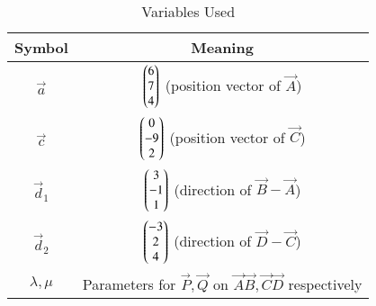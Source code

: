 \begin{table}[h!]
\centering
\begin{tabular}{|c|c|}
\hline
Symbol & Meaning \\ \hline
$\vec{a}$ & $\begin{pmatrix}6\\7\\4\end{pmatrix}$ (position vector of $\vec{A}$) \\ \hline
$\vec{c}$ & $\begin{pmatrix}0\\-9\\2\end{pmatrix}$ (position vector of $\vec{C}$) \\ \hline
$\vec{d}_1$ & $\begin{pmatrix}3\\-1\\1\end{pmatrix}$ (direction of $\vec{B}-\vec{A}$) \\ \hline
$\vec{d}_2$ & $\begin{pmatrix}-3\\2\\4\end{pmatrix}$ (direction of $\vec{D}-\vec{C}$) \\ \hline
$\lambda,\mu$ & Parameters for $\vec{P},\vec{Q}$ on $\vec{A}\vec{B},\vec{C}\vec{D}$ respectively \\ \hline
\end{tabular}
\caption{Variables Used}
\label{tab:198-vars}
\end{table}